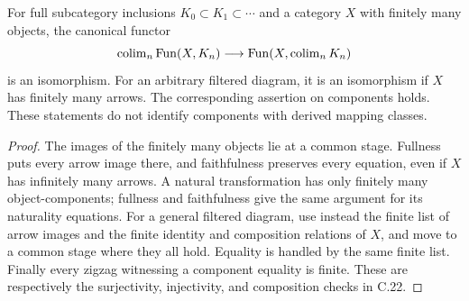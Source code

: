 \begin{proposition}\label{F:C22}
For full subcategory inclusions $K_0\subset K_1\subset\cdots$ and a
category $X$ with finitely many objects, the canonical functor
\[
 \operatorname{colim}_n\operatorname{Fun}(X,K_n)\longrightarrow
 \operatorname{Fun}(X,\operatorname{colim}_n K_n)
\]
is an isomorphism. For an arbitrary filtered diagram, it is an
isomorphism if $X$ has finitely many arrows. The corresponding assertion
on components holds. These statements do not identify components with
derived mapping classes.
\end{proposition}
\begin{proof}
The images of the finitely many objects lie at a common stage. Fullness
puts every arrow image there, and faithfulness preserves every equation,
even if $X$ has infinitely many arrows. A natural transformation has only
finitely many object-components; fullness and faithfulness give the same
argument for its naturality equations. For a general filtered diagram,
use instead the finite list of arrow images and the finite identity and
composition relations of $X$, and move to a common stage where they all
hold. Equality is handled by the same finite list. Finally every zigzag
witnessing a component equality is finite. These are respectively the
surjectivity, injectivity, and composition checks in C.22.
\end{proof}

